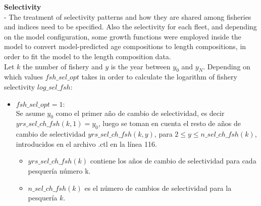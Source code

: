 \documentclass{article}
\begin{document}
\textbf{Selectivity}\\
- The treatment of selectivity patterns and how they are shared among fisheries and indices need to be specified. Also the selectivity for each fleet, and depending on the model configuration, some growth functions were employed inside the model to convert model-predicted age compositions to length compositions, in order to fit the model to the length composition data.\\

Let $k$ the number of fishery and $y$ is the year between $y_0$ and $y_N$.
Depending on which values $fsh\_sel\_opt$ takes in order to calculate the logarithm of fishery selectivity $log\_sel\_fsh$:
\begin{itemize}
\item $fsh\_sel\_opt=1:$\\
Se asume $y_0$ como el primer año de cambio de selectividad, es decir $yrs\_sel\_ch\_fsh(k,1)=y_0$, luego se toman en cuenta el resto de años de cambio de selectividad $yrs\_sel\_ch\_fsh(k,y)$, para $2\leq y \leq n\_sel\_ch\_fsh(k)$, introducidos en el archivo .ctl en la línea 116.
\begin{itemize}
    \item $yrs\_sel\_ch\_fsh(k)$ contiene los años de cambio de selectividad para cada pesquería número k.
    \item $n\_sel\_ch\_fsh(k)$ es el número de cambios de selectividad para la pesquería $k$.
    
\end{itemize}



\end{itemize}
\end{document}
